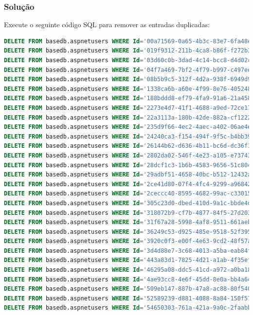 \documentclass[12pt]{article}
\begin{document}
\subsubsection{Solução}
Execute o seguinte código SQL para remover as entradas duplicadas:
    \begin{lstlisting}[language=SQL, breaklines=true]
DELETE FROM basedb.aspnetusers WHERE Id='00a71569-0a65-4b3c-83e7-6fa48e6f9a92';
DELETE FROM basedb.aspnetusers WHERE Id='019f9312-211b-4ca8-b86f-f272b3e7459c';
DELETE FROM basedb.aspnetusers WHERE Id='03d60c0b-3dad-4c14-bcc8-d4d02c35933d';
DELETE FROM basedb.aspnetusers WHERE Id='04f7a469-7bf2-4f79-b997-c497eebe07c9';
DELETE FROM basedb.aspnetusers WHERE Id='08b5b9c5-312f-4d2a-938f-6949d9771d84';
DELETE FROM basedb.aspnetusers WHERE Id='1338ca6b-a60e-4f99-8e76-4052485f553e';
DELETE FROM basedb.aspnetusers WHERE Id='188bddd8-ef79-4fa9-91a6-21a458297edd';
DELETE FROM basedb.aspnetusers WHERE Id='2273e4d7-41f1-4688-a9ed-72ce17210d0c';
DELETE FROM basedb.aspnetusers WHERE Id='22a3113a-180b-42de-882a-cf12221a8842';
DELETE FROM basedb.aspnetusers WHERE Id='235d9f66-4ec2-4aec-a402-06ae4e5eb5e7';
DELETE FROM basedb.aspnetusers WHERE Id='24240ca3-f154-494f-9f5c-b4bb39591aca';
DELETE FROM basedb.aspnetusers WHERE Id='26144b62-d636-4b11-bc6d-dc36f165224e';
DELETE FROM basedb.aspnetusers WHERE Id='2802da02-546f-4e23-a105-e7374359509e';
DELETE FROM basedb.aspnetusers WHERE Id='28dcf1c3-1b6b-4583-9656-51c8048a1fe1';
DELETE FROM basedb.aspnetusers WHERE Id='29adbf51-4658-40bc-b512-12432ab55b9e';
DELETE FROM basedb.aspnetusers WHERE Id='2ce41d80-07f4-4fc4-9299-a968422a1e5b';
DELETE FROM basedb.aspnetusers WHERE Id='2ceccc40-8595-4682-99ac-c330157ef1c0';
DELETE FROM basedb.aspnetusers WHERE Id='305c23d0-dbed-410d-9a1c-bbde4d5f40b6';
DELETE FROM basedb.aspnetusers WHERE Id='318072b9-cf7b-4877-84f5-27d2031528ea';
DELETE FROM basedb.aspnetusers WHERE Id='31f67a28-5998-4af8-9511-661aeb7627df';
DELETE FROM basedb.aspnetusers WHERE Id='36249c53-d925-485e-9518-52f395b0d4bb';
DELETE FROM basedb.aspnetusers WHERE Id='3920c0f3-e00f-4e63-9cd2-48f57ae69048';
DELETE FROM basedb.aspnetusers WHERE Id='3d4d88e7-3c68-4013-a5ba-eab84ff0b31a';
DELETE FROM basedb.aspnetusers WHERE Id='443a83d1-7825-4d21-a1ab-4f35eff72d10';
DELETE FROM basedb.aspnetusers WHERE Id='46295a08-ddc5-41cd-a972-a0ba180c24bb';
DELETE FROM basedb.aspnetusers WHERE Id='4ae93cc8-4e6f-45dd-8e0a-bb4a645f638a';
DELETE FROM basedb.aspnetusers WHERE Id='509eb147-887b-47a8-ac88-80f540c18622';
DELETE FROM basedb.aspnetusers WHERE Id='52589239-d881-4088-8a84-150f5775d034';
DELETE FROM basedb.aspnetusers WHERE Id='54650303-761a-421a-9a0c-2faabbe4c718';

\end{lstlisting}
\end{document}
